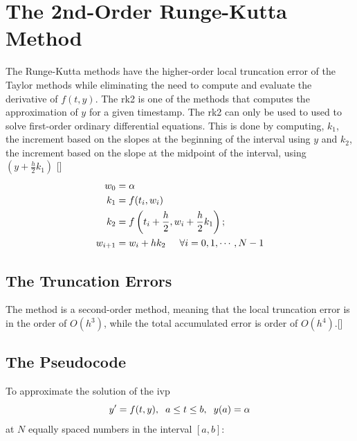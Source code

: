 \documentclass[12pt,oneside]{book}
\begin{document}
	\section{The 2nd-Order Runge-Kutta Method} \label{m:rk2}
		\begin{spacing}{1.2}
			
			The Runge-Kutta methods have the higher-order local truncation error of the Taylor methods while eliminating the need to compute and evaluate the derivative of $ f(t, y) $. The \ac{rk2} is one of the methods that computes the approximation of $ y $ for a given timestamp. The \ac{rk2} can only be used to used to solve first-order ordinary differential equations. This is done by computing, $ k_{1} $, the increment based on the slopes at the beginning of the interval using $ y $ and $ k_2 $, the increment based on the slope at the midpoint of the interval, using $ (y + \frac{h}{2}k_{1}) $ []
			\begin{equation} \label{eq:rk2}
				\begin{split}
					w_{0} & = \alpha \\
					k_{1} & = f(t_{i},w_{i}) \\
					k_{2} & = f\left(t_{i} + \frac{h}{2}, w_{i} + \frac{h}{2}k_{1}\right); \\
					w_{i+1} & = w_{i} + hk_{2} \hspace*{0.5cm} \forall i = 0, 1, \cdots, N - 1
				\end{split}
			\end{equation}
			
			\subsection*{The Truncation Errors}
				The method is a second-order method, meaning that the local truncation error is in the order of $ O(h^3) $, while the total accumulated error is order of $ O(h^4) $.[]
			
			\clearpage
			\subsection*{The Pseudocode}
				To approximate the solution of the \ac{ivp} 
				\[ y' = f(t,y), \hspace*{0.2cm} a \leq t \leq b, \hspace*{0.2cm} y(a) = \alpha \]
				at $ N $ equally spaced numbers in the interval $ [a, b]: $
				

\end{spacing}
\end{document}
